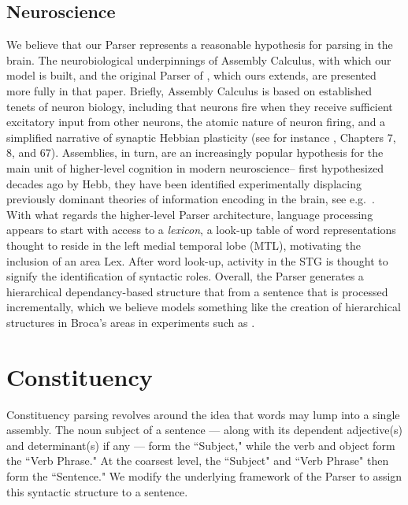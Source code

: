 \documentclass[11pt]{article}
\begin{document}
\subsection{Neuroscience} 
We believe that our Parser represents a reasonable hypothesis for parsing in the brain. The neurobiological underpinnings of Assembly Calculus, with which our model is built, and the original Parser of \citet{Parser}, which ours extends, are presented more fully in that paper. Briefly, Assembly Calculus is based on established tenets of neuron biology, including that neurons fire when they receive sufficient excitatory input from other neurons, the atomic nature of neuron firing, and a simplified narrative of synaptic Hebbian plasticity (see for instance \citet{NeuralScience}, Chapters 7, 8, and 67). Assemblies, in turn, are an increasingly popular hypothesis for the main unit of higher-level cognition in modern neuroscience-- first hypothesized decades ago by Hebb, they have been identified experimentally \cite{Harris} displacing previously dominant theories of information encoding in the brain, see e.g.~\citet{Eichenbaum}. With what regards the higher-level Parser architecture, language processing appears to start with access to a {\em lexicon}, a look-up table of word representations thought to reside in the left medial temporal lobe (MTL), motivating the inclusion of an area {\sc Lex}. After word look-up, activity in the STG is thought to signify the identification of syntactic roles. Overall, the Parser generates a hierarchical dependancy-based structure that from a sentence that is processed incrementally, which we believe models something like the creation of hierarchical structures in Broca's areas in experiments such as \citet{Poeppel}.

\section{Constituency}

Constituency parsing revolves around the idea that words may lump into a single assembly. The noun subject of a sentence --- along with its dependent adjective(s) and determinant(s) if any --- form the ``Subject," while the verb and object form the ``Verb Phrase." At the coarsest level, the ``Subject" and ``Verb Phrase" then form the ``Sentence." We modify the underlying framework of the Parser to assign this syntactic structure to a sentence. 
\end{document}
